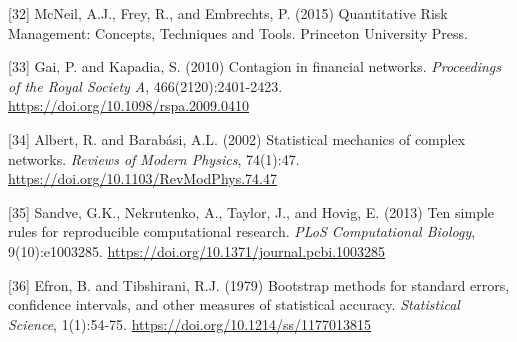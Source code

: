 \documentclass[a4 paper, 11pt,twoside]{article}
\newcommand{\0}{\Bf{0}}
\theoremstyle{definition}
\begin{document}
\label{ref32}[32] McNeil, A.J., Frey, R., and Embrechts, P. (2015) Quantitative Risk Management: Concepts, Techniques and Tools. Princeton University Press.

\label{ref33}[33] Gai, P. and Kapadia, S. (2010) Contagion in financial networks. \emph{Proceedings of the Royal Society A}, 466(2120):2401-2423. \href{https://doi.org/10.1098/rspa.2009.0410}{https://doi.org/10.1098/rspa.2009.0410}

\label{ref34}[34] Albert, R. and Barabási, A.L. (2002) Statistical mechanics of complex networks. \emph{Reviews of Modern Physics}, 74(1):47. \href{https://doi.org/10.1103/RevModPhys.74.47}{https://doi.org/10.1103/RevModPhys.74.47}

\label{ref35}[35] Sandve, G.K., Nekrutenko, A., Taylor, J., and Hovig, E. (2013) Ten simple rules for reproducible computational research. \emph{PLoS Computational Biology}, 9(10):e1003285. \href{https://doi.org/10.1371/journal.pcbi.1003285}{https://doi.org/10.1371/journal.pcbi.1003285}

\label{ref36}[36] Efron, B. and Tibshirani, R.J. (1979) Bootstrap methods for standard errors, confidence intervals, and other measures of statistical accuracy. \emph{Statistical Science}, 1(1):54-75. \href{https://doi.org/10.1214/ss/1177013815}{https://doi.org/10.1214/ss/1177013815}
\end{document}
